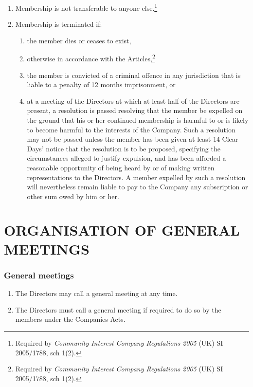 \documentclass[a4paper,12pt]{article}
\begin{document}
\begin{enumerate}
  \color{red}
  \item Membership is not transferable to anyone else.\footnote{Required by \textit{Community Interest Company Regulations 2005} (UK) SI 2005/1788, sch 1(2).}
  \item Membership is terminated if:
  \begin{enumerate}
    \item the member dies or ceases to exist,
    \item otherwise in accordance with the Articles,\footnote{Required by \textit{Community Interest Company Regulations 2005} (UK) SI 2005/1788, sch 1(2).}\color{black}
    \item the member is convicted of a criminal offence in any jurisdiction that is liable to a penalty of 12 months imprisonment, or
    \item at a meeting of the Directors at which at least half of the Directors are present, a resolution is passed resolving that the member be expelled on the ground that his or her continued membership is harmful to or is likely to become harmful to the interests of the Company. Such a resolution may not be passed unless the member has been given at least 14 Clear Days' notice that the resolution is to be proposed, specifying the circumstances alleged to justify expulsion, and has been afforded a reasonable opportunity of being heard by or of making written representations to the Directors. A member expelled by such a resolution will nevertheless remain liable to pay to the Company any subscription or other sum owed by him or her.
  \end{enumerate}
\end{enumerate}

\part*{ORGANISATION OF GENERAL MEETINGS}

\section{General meetings}

\begin{enumerate}
  \item The Directors may call a general meeting at any time.
  \item The Directors must call a general meeting if required to do so by the members under the Companies Acts.
\end{enumerate}
\end{document}
